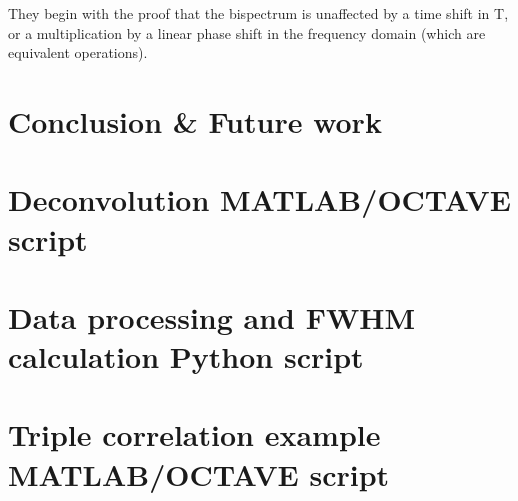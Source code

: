 \documentclass[a4paper]{article}
\begin{document}
They begin with the proof that the bispectrum is unaffected by a time shift in T, or a multiplication by a linear phase shift in the frequency domain (which are equivalent operations).

\section{Conclusion \& Future work}




\appendix
\newpage
\section{Deconvolution MATLAB/OCTAVE script}

\section{Data processing and FWHM calculation Python script}

\section{Triple correlation example MATLAB/OCTAVE script}

\end{document}
